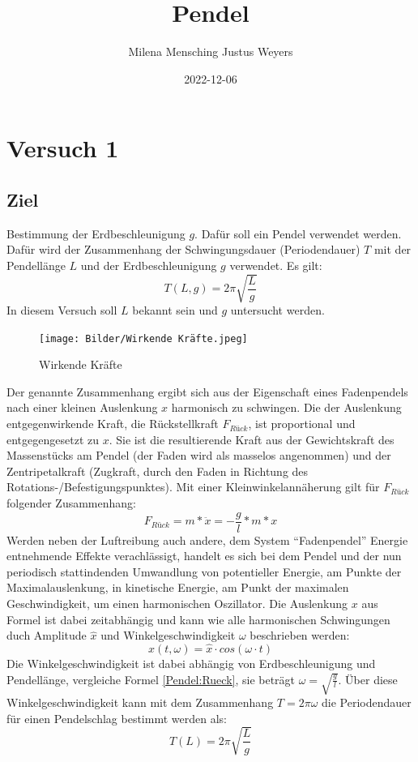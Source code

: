 \documentclass[
  9pt,
]{article}
\title{Pendel}
\author{Milena Mensching Justus Weyers}
\date{2022-12-06}
\begin{document}
\maketitle

\hypertarget{versuch-1}{%
\section{Versuch 1}\label{versuch-1}}

\hypertarget{ziel}{%
\subsection{Ziel}\label{ziel}}

Bestimmung der Erdbeschleunigung \(g\). Dafür soll ein Pendel verwendet
werden. Dafür wird der Zusammenhang der Schwingungsdauer (Periodendauer)
\(T\) mit der Pendellänge \(L\) und der Erdbeschleunigung \(g\)
verwendet. Es gilt: \[T(L,g) = 2\pi \sqrt{\frac{L}{g}}\] In diesem
Versuch soll \(L\) bekannt sein und \(g\) untersucht werden.

\begin{figure}
\centering
\texttt{[image: Bilder/Wirkende Kräfte.jpeg]}
\caption{Wirkende Kräfte}
\end{figure}

Der genannte Zusammenhang ergibt sich aus der Eigenschaft eines
Fadenpendels nach einer kleinen Auslenkung \(x\) harmonisch zu
schwingen. Die der Auslenkung entgegenwirkende Kraft, die Rückstellkraft
\(F_{Rück}\), ist proportional und entgegengesetzt zu \(x\). Sie ist die
resultierende Kraft aus der Gewichtskraft des Massenstücks am Pendel
(der Faden wird als masselos angenommen) und der Zentripetalkraft
(Zugkraft, durch den Faden in Richtung des
Rotations-/Befestigungspunktes). Mit einer Kleinwinkelannäherung gilt
für \(F_{Rück}\) folgender Zusammenhang:
\begin{equation}\label{Pendel:Rueck}
F_{Rück} = m * \ddot{x} = -\frac{g}{l}*m*x
\end{equation} Werden neben der Luftreibung auch andere, dem System
``Fadenpendel'' Energie entnehmende Effekte verachlässigt, handelt es
sich bei dem Pendel und der nun periodisch stattindenden Umwandlung von
potentieller Energie, am Punkte der Maximalauslenkung, in kinetische
Energie, am Punkt der maximalen Geschwindigkeit, um einen harmonischen
Oszillator. Die Auslenkung \(x\) aus Formel \label{Pendel:Ruek} ist
dabei zeitabhängig und kann wie alle harmonischen Schwingungen duch
Amplitude \(\hat{x}\) und Winkelgeschwindigkeit \(\omega\) beschrieben
werden: \begin{equation}\label{Pendel:Schwingung}
  x(t,\omega) = \hat{x} \cdot cos(\omega \cdot t)
\end{equation} Die Winkelgeschwindigkeit ist dabei abhängig von
Erdbeschleunigung und Pendellänge, vergleiche Formel \ref{Pendel:Rueck},
sie beträgt \(\omega=\sqrt{\frac{g}{l}}\). Über diese
Winkelgeschwindigkeit kann mit dem Zusammenhang \(T=2\pi\omega\) die
Periodendauer für einen Pendelschlag bestimmt werden als:
\begin{equation}\label{Pendel:Periodendauer}
T(L) = 2\pi \sqrt{\frac{L}{g}}
\end{equation}
\end{document}
